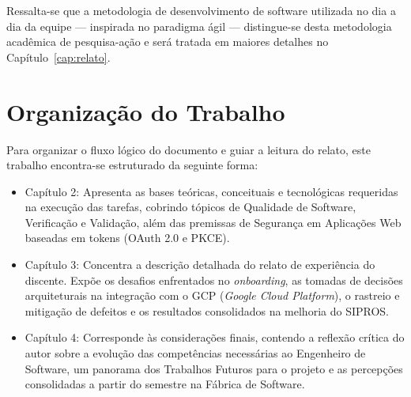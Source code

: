 Ressalta-se que a metodologia de desenvolvimento de software utilizada no dia a dia da equipe --- inspirada no paradigma ágil --- distingue-se desta metodologia acadêmica de pesquisa-ação e será tratada em maiores detalhes no Capítulo~\ref{cap:relato}.

\section{Organização do Trabalho}

Para organizar o fluxo lógico do documento e guiar a leitura do relato, este trabalho encontra-se estruturado da seguinte forma:

\begin{itemize}
    \item Capítulo 2: Apresenta as bases teóricas, conceituais e tecnológicas requeridas na execução das tarefas, cobrindo tópicos de Qualidade de Software, Verificação e Validação, além das premissas de Segurança em Aplicações Web baseadas em tokens (OAuth 2.0 e PKCE).
    
    \item Capítulo 3: Concentra a descrição detalhada do relato de experiência do discente. Expõe os desafios enfrentados no \textit{onboarding}, as tomadas de decisões arquiteturais na integração com o GCP (\textit{Google Cloud Platform}), o rastreio e mitigação de defeitos e os resultados consolidados na melhoria do SIPROS.
    
    \item Capítulo 4: Corresponde às considerações finais, contendo a reflexão crítica do autor sobre a evolução das competências necessárias ao Engenheiro de Software, um panorama dos Trabalhos Futuros para o projeto e as percepções consolidadas a partir do semestre na Fábrica de Software.
\end{itemize}
